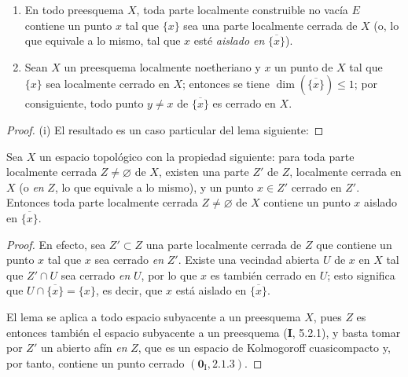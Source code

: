 \begin{proposition}[5.1.10]
\label{IV.2.5.1.10-fr}
\begin{enumerate}
\item[\textup{(i)}] En todo preesquema $X$, toda parte localmente construible no
vacía $E$ contiene un punto $x$ tal que $\{x\}$ sea una parte localmente
cerrada de $X$ \textup{(o, lo que equivale a lo mismo, tal que $x$ esté \emph{aislado en}
$\overline{\{x\}}$)}.
\item[\textup{(ii)}] Sean $X$ un preesquema localmente noetheriano y $x$ un punto de
$X$ tal que $\{x\}$ sea localmente cerrado en $X$; entonces se tiene
$\dim(\overline{\{x\}})\leq1$; por consiguiente, todo punto $y\ne x$ de
$\overline{\{x\}}$ es cerrado en $X$.
\end{enumerate}
\end{proposition}

\begin{proof}
(i) El resultado es un caso particular del lema siguiente:
\end{proof}

\begin{lemma}[5.1.10.1]
\label{IV.2.5.1.10.1-fr}
Sea $X$ un espacio topológico con la propiedad siguiente: para toda parte
localmente cerrada $Z\ne\varnothing$ de $X$, existen una parte $Z'$ de $Z$,
localmente cerrada en $X$ \textup{(o \emph{en} $Z$, lo que equivale a lo mismo)}, y un punto
$x\in Z'$ cerrado \textup{en} $Z'$. Entonces toda parte localmente cerrada
$Z\ne\varnothing$ de $X$ contiene un punto $x$ aislado en
$\overline{\{x\}}$.
\end{lemma}

\begin{proof}
En efecto, sea $Z'\subset Z$ una parte localmente cerrada de $Z$ que contiene
un punto $x$ tal que $x$ sea cerrado \emph{en} $Z'$. Existe una vecindad abierta
$U$ de $x$ en $X$ tal que $Z'\cap U$ sea cerrado \emph{en} $U$, por lo que $x$ es
también cerrado en $U$; esto significa que $U\cap\overline{\{x\}}=\{x\}$, es
decir, que $x$ está aislado en $\overline{\{x\}}$.

El lema se aplica a todo espacio subyacente a un preesquema $X$, pues $Z$ es
entonces también el espacio subyacente a un preesquema (\textbf I, 5.2.1), y basta
tomar por $Z'$ un abierto afín \emph{en} $Z$, que es un espacio de Kolmogoroff
cuasicompacto y, por tanto, contiene un punto cerrado
$(\mathbf{0}_{\mathrm I},2.1.3)$.
\end{proof}



